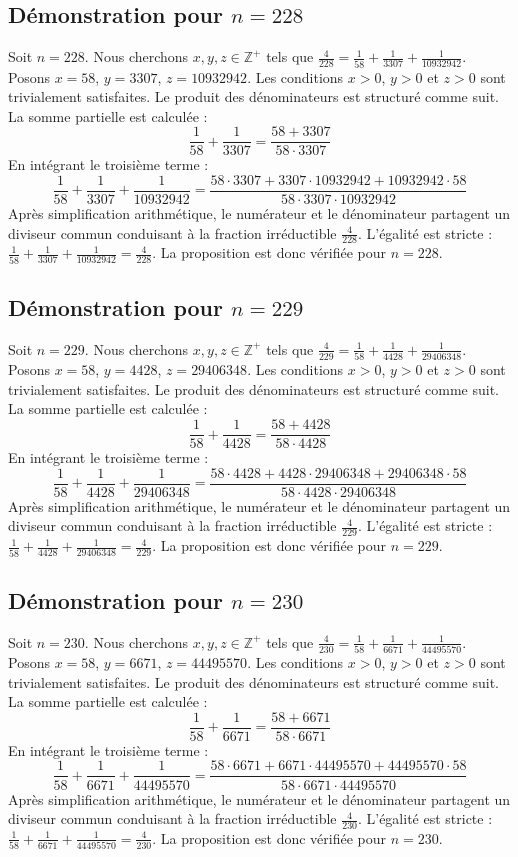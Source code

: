 \documentclass[11pt,a4paper]{article}
\begin{document}
\subsection{Démonstration pour $n = 228$}
Soit $n = 228$. Nous cherchons $x, y, z \in \mathbb{Z}^{+}$ tels que $\frac{4}{228} = \frac{1}{58} + \frac{1}{3307} + \frac{1}{10932942}$.
Posons $x = 58$, $y = 3307$, $z = 10932942$.
Les conditions $x > 0$, $y > 0$ et $z > 0$ sont trivialement satisfaites.
Le produit des dénominateurs est structuré comme suit. La somme partielle est calculée :
$$ \frac{1}{58} + \frac{1}{3307} = \frac{58+3307}{58 \cdot 3307} $$
En intégrant le troisième terme :
$$ \frac{1}{58} + \frac{1}{3307} + \frac{1}{10932942} = \frac{58 \cdot 3307 + 3307 \cdot 10932942 + 10932942 \cdot 58}{58 \cdot 3307 \cdot 10932942} $$
Après simplification arithmétique, le numérateur et le dénominateur partagent un diviseur commun conduisant à la fraction irréductible $\frac{4}{228}$.
L'égalité est stricte : $\frac{1}{58} + \frac{1}{3307} + \frac{1}{10932942} = \frac{4}{228}$.
La proposition est donc vérifiée pour $n = 228$.
\subsection{Démonstration pour $n = 229$}
Soit $n = 229$. Nous cherchons $x, y, z \in \mathbb{Z}^{+}$ tels que $\frac{4}{229} = \frac{1}{58} + \frac{1}{4428} + \frac{1}{29406348}$.
Posons $x = 58$, $y = 4428$, $z = 29406348$.
Les conditions $x > 0$, $y > 0$ et $z > 0$ sont trivialement satisfaites.
Le produit des dénominateurs est structuré comme suit. La somme partielle est calculée :
$$ \frac{1}{58} + \frac{1}{4428} = \frac{58+4428}{58 \cdot 4428} $$
En intégrant le troisième terme :
$$ \frac{1}{58} + \frac{1}{4428} + \frac{1}{29406348} = \frac{58 \cdot 4428 + 4428 \cdot 29406348 + 29406348 \cdot 58}{58 \cdot 4428 \cdot 29406348} $$
Après simplification arithmétique, le numérateur et le dénominateur partagent un diviseur commun conduisant à la fraction irréductible $\frac{4}{229}$.
L'égalité est stricte : $\frac{1}{58} + \frac{1}{4428} + \frac{1}{29406348} = \frac{4}{229}$.
La proposition est donc vérifiée pour $n = 229$.
\subsection{Démonstration pour $n = 230$}
Soit $n = 230$. Nous cherchons $x, y, z \in \mathbb{Z}^{+}$ tels que $\frac{4}{230} = \frac{1}{58} + \frac{1}{6671} + \frac{1}{44495570}$.
Posons $x = 58$, $y = 6671$, $z = 44495570$.
Les conditions $x > 0$, $y > 0$ et $z > 0$ sont trivialement satisfaites.
Le produit des dénominateurs est structuré comme suit. La somme partielle est calculée :
$$ \frac{1}{58} + \frac{1}{6671} = \frac{58+6671}{58 \cdot 6671} $$
En intégrant le troisième terme :
$$ \frac{1}{58} + \frac{1}{6671} + \frac{1}{44495570} = \frac{58 \cdot 6671 + 6671 \cdot 44495570 + 44495570 \cdot 58}{58 \cdot 6671 \cdot 44495570} $$
Après simplification arithmétique, le numérateur et le dénominateur partagent un diviseur commun conduisant à la fraction irréductible $\frac{4}{230}$.
L'égalité est stricte : $\frac{1}{58} + \frac{1}{6671} + \frac{1}{44495570} = \frac{4}{230}$.
La proposition est donc vérifiée pour $n = 230$.
\end{document}

